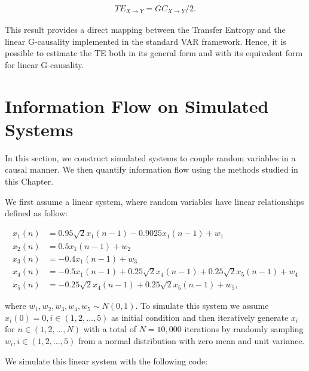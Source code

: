 \documentclass[]{book}
\theoremstyle{definition}
\theoremstyle{definition}
\theoremstyle{definition}
\theoremstyle{remark}
\begin{document}
\begin{align}
TE_{X \rightarrow Y} = GC_{X \rightarrow Y}/2.
\label{eq:GCGC2}
\end{align}

This result provides a direct mapping between the Transfer Entropy and
the linear G-causality implemented in the standard VAR framework. Hence,
it is possible to estimate the TE both in its general form and with its
equivalent form for linear G-causality.

\section{Information Flow on Simulated
Systems}\label{information-flow-on-simulated-systems}

In this section, we construct simulated systems to couple random
variables in a causal manner. We then quantify information flow using
the methods studied in this Chapter.

We first assume a linear system, where random variables have linear
relationships defined as follow:

\begin{align}
x_1(n) &= 0.95\sqrt{2}x_1(n-1) - 0.9025x_1(n-1) + w_1\\ \nonumber
x_2(n) &= 0.5x_1(n-1) + w_2\\ \nonumber
x_3(n) &= -0.4x_1(n-1) + w_3\\ \nonumber
x_4(n) &= -0.5x_1(n-1) + 0.25\sqrt{2}x_4(n-1) + 0.25\sqrt{2}x_5(n-1) + w_4\\ \nonumber
x_5(n) &= -0.25\sqrt{2}x_4(n-1) + 0.25\sqrt{2}x_5(n-1) + w_5, \nonumber
\end{align}

where \(w_1, w_2, w_3, w_4, w_5 \sim N(0, 1)\). To simulate this system
we assume \(x_i(0) = 0, i \in (1, 2, \ldots, 5)\) as initial condition
and then iteratively generate \(x_i\) for \(n \in (1, 2, \ldots, N)\)
with a total of \(N = 10,000\) iterations by randomly sampling
\(w_i, i \in (1, 2, \ldots, 5)\) from a normal distribution with zero
mean and unit variance.

We simulate this linear system with the following code:
\end{document}
